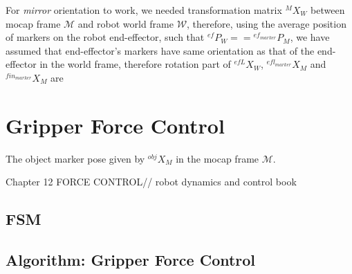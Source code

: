 For {\it mirror} orientation to work, we needed transformation matrix $\mathcal{}^{M}{X}_W$ between mocap frame $\mathcal{M}$ and robot world frame $\mathcal{W}$, therefore, using the average position of markers on the robot end-effector, such that $\mathcal{}^{ef}{P}_W == {}^{{ef}_{marker}}{P}_M$, we have assumed that end-effector's markers have same orientation as that of the end-effector in the world frame, therefore rotation part of $\mathcal{}^{efL}{X}_W$, $\mathcal{}^{efl_{marker}}{X}_M$ and $\mathcal{}^{fin_{marker}}{X}_M$ are 






\newpage
\section{Gripper Force Control}

The object marker pose given by $\mathcal{}^{obj}{X}_M$ in the mocap frame $\mathcal{M}$.

Chapter 12
FORCE CONTROL// robot dynamics and control book



\subsection{FSM}



\subsection{Algorithm: Gripper Force Control}

